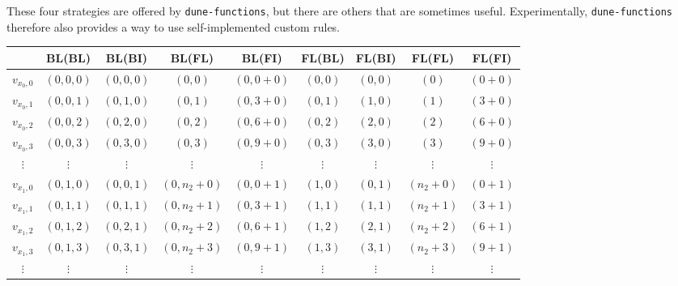 \documentclass[a4paper,10pt,headings=normal,bibliography=totoc]{scrartcl}
\newcommand{\dunemodule}[1]{\texttt{#1}}
\begin{document}
These four strategies are offered by \dunemodule{dune-functions}, but there are others
that are sometimes useful.  Experimentally, \dunemodule{dune-functions} therefore also
provides a way to use self-implemented custom rules.

\bigskip

\begin{table}
\footnotesize
\begin{center}
\begin{tabular}{c|c|c|c|c|c|c|c|c}
    & BL(BL)
    & BL(BI)
    & BL(FL)
    & BL(FI)
    & FL(BL)
    & FL(BI)
    & FL(FL)
    & FL(FI)
    \\
  \hline
  $v_{x_0,0}$
    & $(0,0,0)$
    & $(0,0,0)$
    & $(0,0)$
    & $(0,0+0)$
    & $(0,0)$
    & $(0,0)$
    & $(0)$
    & $(0+0)$
    \\
  $v_{x_0,1}$
    & $(0,0,1)$
    & $(0,1,0)$
    & $(0,1)$
    & $(0,3+0)$
    & $(0,1)$
    & $(1,0)$
    & $(1)$
    & $(3+0)$
    \\
  $v_{x_0,2}$
    & $(0,0,2)$
    & $(0,2,0)$
    & $(0,2)$
    & $(0,6+0)$
    & $(0,2)$
    & $(2,0)$
    & $(2)$
    & $(6+0)$
    \\
  $v_{x_0,3}$
    & $(0,0,3)$
    & $(0,3,0)$
    & $(0,3)$
    & $(0,9+0)$
    & $(0,3)$
    & $(3,0)$
    & $(3)$
    & $(9+0)$
    \\
  $\vdots$ & $\vdots$ & $\vdots$ & $\vdots$ &  $\vdots$ & $\vdots$ & $\vdots$ & $\vdots$ & $\vdots$
  \\
  $v_{x_1,0}$
    & $(0,1,0)$
    & $(0,0,1)$
    & $(0,n_2+0)$
    & $(0,0+1)$
    & $(1,0)$
    & $(0,1)$
    & $(n_2+0)$
    & $(0+1)$
    \\
  $v_{x_1,1}$
    & $(0,1,1)$
    & $(0,1,1)$
    & $(0,n_2+1)$
    & $(0,3+1)$
    & $(1,1)$
    & $(1,1)$
    & $(n_2+1)$
    & $(3+1)$
    \\
  $v_{x_1,2}$
    & $(0,1,2)$
    & $(0,2,1)$
    & $(0,n_2+2)$
    & $(0,6+1)$
    & $(1,2)$
    & $(2,1)$
    & $(n_2+2)$
    & $(6+1)$
    \\
  $v_{x_1,3}$
    & $(0,1,3)$
    & $(0,3,1)$
    & $(0,n_2+3)$
    & $(0,9+1)$
    & $(1,3)$
    & $(3,1)$
    & $(n_2+3)$
    & $(9+1)$
    \\
  $\vdots$ & $\vdots$ & $\vdots$ & $\vdots$ &  $\vdots$ & $\vdots$ & $\vdots$ & $\vdots$ & $\vdots$

\end{tabular}
\end{center}
\end{table}
\end{document}
